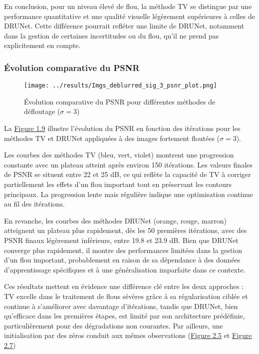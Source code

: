 \documentclass[a4paper, 12pt]{report} %
\begin{document}
En conclusion, pour un niveau élevé de flou, la méthode TV se distingue par une performance quantitative et une qualité visuelle légèrement supérieures à celles de DRUNet. Cette différence pourrait refléter une limite de DRUNet, notamment dans la gestion de certaines incertitudes ou du flou, qu’il ne prend pas explicitement en compte.

\subsubsection{Évolution comparative du PSNR}
\begin{figure}[H]
\centering
\begin{adjustbox}{width=0.985\linewidth, totalheight=0.47 \textheight, angle=0, scale= 0.9, minipage= 4.2\linewidth, margin= 0}
    \texttt{[image: ../results/Imgs\_deblurred\_sig\_3\_psnr\_plot.png]}
\end{adjustbox}
    \caption{Évolution comparative du PSNR pour différentes méthodes de défloutage (\(\sigma = 3\))}
    \label{fig:9}
\end{figure} 

La \hyperref[fig:9]{Figure 1.9} illustre l'évolution du PSNR en fonction des itérations pour les méthodes TV et DRUNet appliquées à des images fortement floutées (\(\sigma = 3\)).

Les courbes des méthodes TV (bleu, vert, violet) montrent une progression constante avec un plateau atteint après environ 150 itérations. Les valeurs finales de PSNR se situent entre 22 et 25 dB, ce qui reflète la capacité de TV à corriger partiellement les effets d’un flou important tout en préservant les contours principaux. La progression lente mais régulière indique une optimisation continue au fil des itérations.

En revanche, les courbes des méthodes DRUNet (orange, rouge, marron) atteignent un plateau plus rapidement, dès les 50 premières itérations, avec des PSNR finaux légèrement inférieurs, entre 19.8 et 23.9 dB. Bien que DRUNet converge plus rapidement, il montre des performances limitées dans la gestion d’un flou important, probablement en raison de sa dépendance à des données d’apprentissage spécifiques et à une généralisation imparfaite dans ce contexte.

Ces résultats mettent en évidence une différence clé entre les deux approches : TV excelle dans le traitement de flous sévères grâce à sa régularisation ciblée et continue à s’améliorer avec davantage d’itérations, tandis que DRUNet, bien qu’efficace dans les premières étapes, est limité par son architecture prédéfinie, particulièrement pour des dégradations non courantes. Par ailleurs, une initialisation par des zéros conduit aux mêmes observations (\hyperref[fig:16]{Figure 2.5} et \hyperref[fig:18]{Figure 2.7})
\end{document}
